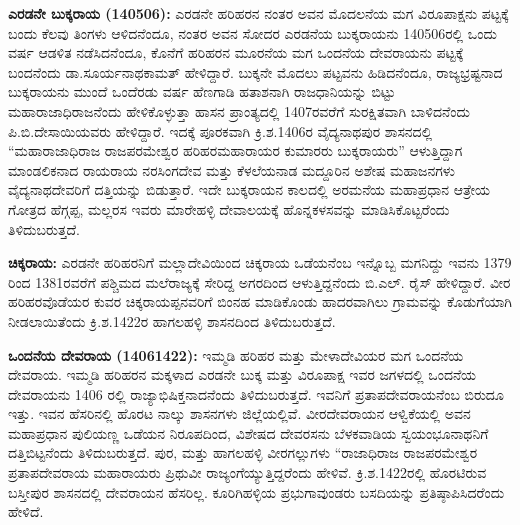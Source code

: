 \newpage

\textbf{ ಎರಡನೇ ಬುಕ್ಕರಾಯ (1405\general{\enginline{-}}06): } ಎರಡನೇ ಹರಿಹರನ ನಂತರ ಅವನ ಮೊದಲನೆಯ ಮಗ ವಿರೂಪಾಕ್ಷನು ಪಟ್ಟಕ್ಕೆ ಬಂದು ಕೆಲವು ತಿಂಗಳು ಆಳಿದನೆಂದೂ, ನಂತರ ಅವನ ಸೋದರ ಎರಡನೆಯ ಬುಕ್ಕರಾಯನು 1405\enginline{-}06ರಲ್ಲಿ ಒಂದು ವರ್ಷ ಆಡಳಿತ ನಡೆಸಿದನೆಂದೂ, ಕೊನೆಗೆ ಹರಿಹರನ ಮೂರನೆಯ ಮಗ ಒಂದನೆಯ ದೇವರಾಯನು ಪಟ್ಟಕ್ಕೆ ಬಂದನೆಂದು ಡಾ.ಸೂರ್ಯನಾಥಕಾಮತ್​ ಹೇಳಿದ್ದಾರೆ. ಬುಕ್ಕನೇ ಮೊದಲು ಪಟ್ಟವನು ಹಿಡಿದನೆಂದೂ, ರಾಜ್ಯಭ್ರಷ್ಟನಾದ ಬುಕ್ಕರಾಯನು ಮುಂದೆ ಒಂದೆರಡು ವರ್ಷ ಹೆಣಗಾಡಿ ಹತಾಶನಾಗಿ ರಾಜಧಾನಿಯನ್ನು ಬಿಟ್ಟು ಮಹಾರಾಜಾಧಿರಾಜನೆಂದು ಹೇಳಿಕೊಳ್ಳುತ್ತಾ ಹಾಸನ ಪ್ರಾಂತ್ಯದಲ್ಲಿ 1407ರವರೆಗೆ ಸುರಕ್ಷಿತವಾಗಿ ಬಾಳಿದನೆಂದು ಪಿ.ಬಿ.ದೇಸಾಯಿಯವರು ಹೇಳಿದ್ದಾರೆ. ಇದಕ್ಕೆ ಪೂರಕವಾಗಿ ಕ್ರಿ.ಶ.1406ರ ವೈದ್ಯನಾಥಪುರ ಶಾಸನದಲ್ಲಿ “ಮಹಾರಾಜಾಧಿರಾಜ ರಾಜಪರಮೇಶ್ವರ ಹರಿಹರಮಹಾರಾಯರ ಕುಮಾರರು ಬುಕ್ಕರಾಯರು” ಆಳುತ್ತಿದ್ದಾಗ ಮಾಂಡಲಿಕನಾದ ರಾಯರಾಯ ನರಸಿಂಗದೇವ ಮತ್ತು ಕೆಳಲೆಯನಾಡ ಮದ್ದೂರಿನ ಅಶೇಷ ಮಹಾಜನಗಳು ವೈದ್ಯನಾಥದೇವರಿಗೆ ದತ್ತಿಯನ್ನು ಬಿಡುತ್ತಾರೆ. ಇದೇ ಬುಕ್ಕರಾಯನ ಕಾಲದಲ್ಲಿ ಅರಮನೆಯ ಮಹಾಪ್ರಧಾನ ಆತ್ರೇಯ ಗೋತ್ರದ ಹೆಗ್ಗಪ್ಪ, ಮಲ್ಲರಸ ಇವರು ಮಾರೇಹಳ್ಳಿ ದೇವಾಲಯಕ್ಕೆ ಹೊನ್ನಕಳಸವನ್ನು ಮಾಡಿಸಿಕೊಟ್ಟ\-ರೆಂದು ತಿಳಿದುಬರುತ್ತದೆ.

\textbf{ ಚಿಕ್ಕರಾಯ:} ಎರಡನೇ ಹರಿಹರನಿಗೆ ಮಲ್ಲಾದೇವಿಯಿಂದ ಚಿಕ್ಕರಾಯ ಒಡೆಯನೆಂಬ ಇನ್ನೊಬ್ಬ ಮಗನಿದ್ದು ಇವನು 1379 ರಿಂದ 1381ರವರೆಗೆ ಪಶ್ಚಿಮದ ಮಲೆರಾಜ್ಯಕ್ಕೆ ಸೇರಿದ್ದ ಅಗರದಿಂದ ಆಳುತ್ತಿದ್ದನೆಂದು ಬಿ.ಎಲ್​. ರೈಸ್​ ಹೇಳಿದ್ದಾರೆ. ವೀರ ಹರಿಹರವೊಡೆಯರ ಕುವರ ಚಿಕ್ಕರಾಯಪ್ಪನವರಿಗೆ ಬಿಂನಹ ಮಾಡಿಕೊಂಡು ಹಾದರವಾಗಿಲು ಗ್ರಾಮವನ್ನು ಕೊಡುಗೆಯಾಗಿ ನೀಡಲಾಯಿತೆಂದು ಕ್ರಿ.ಶ.1422ರ ಹಾಗಲಹಳ್ಳಿ ಶಾಸನದಿಂದ ತಿಳಿದುಬರುತ್ತದೆ.

\textbf{ಒಂದನೆಯ ದೇವರಾಯ (1406\general{\enginline{-}}1422): } ಇಮ್ಮಡಿ ಹರಿಹರ ಮತ್ತು ಮೇಳಾದೇವಿಯರ ಮಗ ಒಂದನೆಯ ದೇವರಾಯ. ಇಮ್ಮಡಿ ಹರಿಹರನ ಮಕ್ಕಳಾದ ಎರಡನೇ ಬುಕ್ಕ ಮತ್ತು ವಿರೂಪಾಕ್ಷ ಇವರ ಜಗಳದಲ್ಲಿ ಒಂದನೆಯ ದೇವರಾಯನು 1406 ರಲ್ಲಿ ರಾಜ್ಯಾಭಿಷಿಕ್ತನಾದನೆಂದು ತಿಳಿದುಬರುತ್ತದೆ. ಇವನಿಗೆ ಪ್ರತಾಪದೇವರಾಯನೆಂಬ ಬಿರುದೂ ಇತ್ತು. ಇವನ ಹೆಸರಿನಲ್ಲಿ ಹೊರಟ ನಾಲ್ಕು ಶಾಸನಗಳು ಜಿಲ್ಲೆಯಲ್ಲಿವೆ. ವೀರದೇವರಾಯನ ಆಳ್ವಿಕೆಯಲ್ಲಿ ಅವನ ಮಹಾಪ್ರಧಾನ ಪುಲಿಯಣ್ಣ ಒಡೆಯನ ನಿರೂಪದಿಂದ, ವಿಶೇಷದ ದೇವರಸನು ಬೆಳಕವಾಡಿಯ ಸ್ವಯಂಭೂನಾಥನಿಗೆ ದತ್ತಿಬಿಟ್ಟನೆಂದು ತಿಳಿದುಬರುತ್ತದೆ. ಪುರ, ಮತ್ತು ಹಾಗಲಹಳ್ಳಿ ವೀರಗಲ್ಲುಗಳು “ರಾಜಾಧಿರಾಜ ರಾಜಪರಮೇಶ್ವರ ಪ್ರತಾಪದೇವರಾಯ ಮಹಾರಾಯರು ಪ್ರಿಥುವೀ ರಾಜ್ಯಂಗೆಯ್ಯುತ್ತಿದ್ದರೆಂದು ಹೇಳಿವೆ. ಕ್ರಿ.ಶ.1422ರಲ್ಲಿ ಹೊರಟಿರುವ ಬಸ್ತೀಪುರ ಶಾಸನದಲ್ಲಿ ದೇವರಾಯನ ಹೆಸರಿಲ್ಲ. ಕೂರಿಗಿಹಳ್ಳಿಯ ಪ್ರಭುಗಾವುಂಡರು ಬಸದಿಯನ್ನು ಪ್ರತಿಷ್ಠಾಪಿಸಿದರೆಂದು ಹೇಳಿದೆ.

